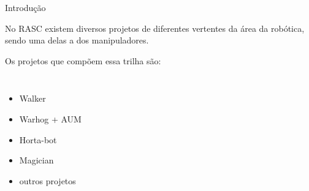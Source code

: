\begin{frame}[t]{Introdução} 

    No RASC existem diversos projetos de diferentes vertentes da área da robótica, sendo uma delas a dos manipuladores.
    \vspace*{0.3cm}

    Os projetos que compõem essa trilha são:
        \begin{columns}[t]
            \begin{itemize}
                \item Walker
                \item Warhog + AUM
                \item Horta-bot
                \item Magician
                \item outros projetos
            \end{itemize}
            \begin{center}
                \begin{figure}
                \end{figure}
            \end{center}
        \end{columns}
\end{frame}
\begin{frame}[c]{} 
   
    \begin{center}
    \end{center}
       
\end{frame}
